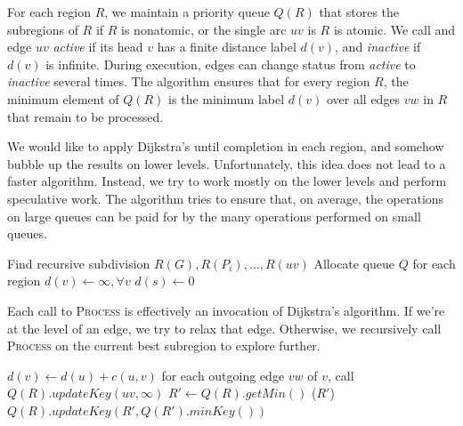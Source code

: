 \documentclass[11pt]{article}
\begin{document}
For each region $R$, we maintain a priority queue $Q(R)$ that stores the subregions of $R$ if $R$ is nonatomic, or the single arc $uv$ is $R$ is atomic. We call and edge $uv$ \emph{active} if its head $v$ has a finite distance label $d(v)$, and \emph{inactive} if $d(v)$ is infinite. During execution, edges can change status from \emph{active} to \emph{inactive} several times. The algorithm ensures that for every region $R$, the minimum element of $Q(R)$ is the minimum label $d(v)$ over all edges $vw$ in $R$ that remain to be processed.

We would like to apply Dijkstra's until completion in each region, and somehow bubble up the results on lower levels. Unfortunately, this idea does not lead to a faster algorithm. Instead, we try to work mostly on the lower levels and perform speculative work. The algorithm tries to ensure that, on average, the operations on large queues can be paid for by the many operations performed on small queues.

\begin{algorithm}
  \label{alg:linear}
  \begin{algorithmic}[1]
    \State Find recursive subdivision $R(G), R(P_i), \ldots, R(uv)$
    \State Allocate queue $Q$ for each region
    \State $d(v) \gets \infty, \forall v$
    \State $d(s) \gets 0$
      \State {}
    \EndFor
      \State {}
    \EndWhile
  \end{algorithmic}
\end{algorithm}

Each call to \textsc{Process} is effectively an invocation of Dijkstra's algorithm. If we're at the level of an edge, we try to relax that edge. Otherwise, we recursively call \textsc{Process} on the current best subregion to explore further.

\begin{algorithm}[!h]
  \label{alg:process}
  \begin{algorithmic}[1]
          \State $d(v) \gets d(u) + c(u,v)$
          \State for each outgoing edge $vw$ of $v$, call 
        \EndIf
        \State $Q(R).updateKey(uv,\infty)$
      \Else
        \Repeat
          \State $R' \gets Q(R).getMin()$
          \State {}($R'$)
          \State $Q(R).updateKey(R',Q(R').minKey())$
      \EndIf
    \EndProcedure
  \end{algorithmic}
\end{algorithm}
\end{document}
